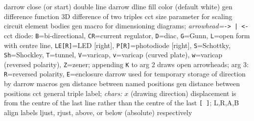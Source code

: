   {darrow}
  {close (or start) double line}
  {darrow}
  {dline fill color (default white)}
  {gen}
  {difference function}
  {3D}
  {difference of two triples}
  {cct}
  {size parameter for scaling circuit element bodies }
  {gen}
  {macro for dimensioning diagrams;
      {\sl arrowhead=}{\tt -> | <-}}
  {cct}
  {diode:
   {\tt B}=bi-directional,
   {\tt CR}=current regulator,
   {\tt D}=diac,
   {\tt G}=Gunn,
   {\tt L}=open form with centre line,
   {\tt LE[R]}=LED [right],
   {\tt P[R]}=photodiode [right],
   {\tt S}=Schottky,
   {\tt Sh}=Shockley,
   {\tt T}=tunnel,
   {\tt V}=varicap,
   {\tt v}=varicap (curved plate),
   {\tt w}=varicap (reversed polarity),
   {\tt Z}=zener;
   appending {\tt K} to arg 2 draws open arrowheads;
   arg 3: {\tt R}=reversed polarity, {\tt E}=enclosure }
  {darrow}
  {used for temporary storage of direction by darrow macros}
  {gen}
  {distance between named positions}
  {gen}
  {distance between positions}
  {cct}
  {general triple label; {\sl chars:}
    $x$ (drawing direction) displacement is from the centre of the last
      line rather than the centre of the last {\tt [ ]};
    L,R,A,B align labels ljust, rjust, above,
      or below (absolute) respectively  }
